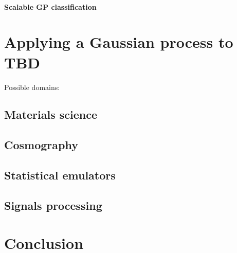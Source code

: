 \documentclass[10pt]{article}
\begin{document}
\paragraph{Scalable GP classification}



\section{Applying a Gaussian process to TBD}
Possible domains:


\subsection{Materials science \cite{materials}}


\subsection{Cosmography \cite{cosmography}}


\subsection{Statistical emulators \cite{emulators}}


\subsection{Signals processing \cite{signals-processing}}



\section{Conclusion}




\printbibliography
\end{document}
